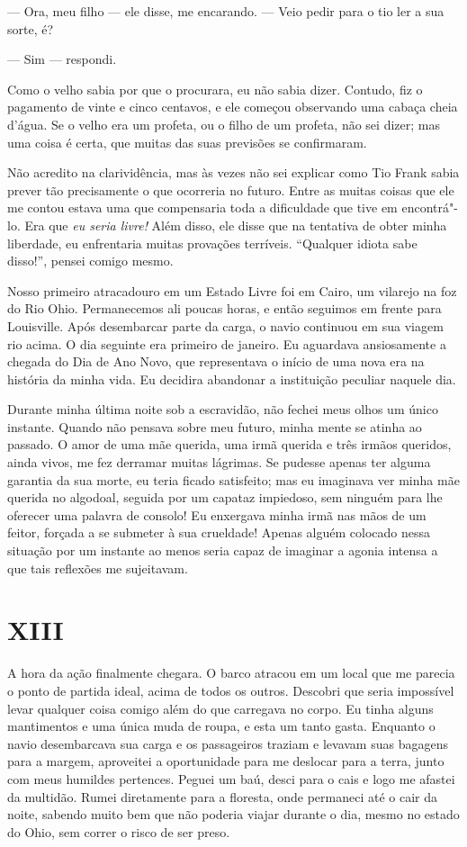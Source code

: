 --- Ora, meu filho --- ele disse, me encarando. --- Veio pedir para o tio
ler a sua sorte, é?

--- Sim --- respondi.

Como o velho sabia por que o procurara, eu não sabia dizer. Contudo, fiz
o pagamento de vinte e cinco centavos, e ele começou observando uma
cabaça cheia d'água. Se o velho era um profeta, ou o filho de um
profeta, não sei dizer; mas uma coisa é certa, que muitas das suas
previsões se confirmaram.

Não acredito na clarividência, mas às vezes não sei explicar como Tio
Frank sabia prever tão precisamente o que ocorreria no futuro. Entre as
muitas coisas que ele me contou estava uma que compensaria toda a
dificuldade que tive em encontrá"-lo. Era que \emph{eu seria livre!} Além
disso, ele disse que na tentativa de obter minha liberdade, eu
enfrentaria muitas provações terríveis. ``Qualquer idiota sabe disso!'',
pensei comigo mesmo.

Nosso primeiro atracadouro em um Estado Livre foi em Cairo, um vilarejo
na foz do Rio Ohio. Permanecemos ali poucas horas, e então seguimos em
frente para Louisville. Após desembarcar parte da carga, o navio
continuou em sua viagem rio acima. O dia seguinte era primeiro de
janeiro. Eu aguardava ansiosamente a chegada do Dia de Ano Novo, que
representava o início de uma nova era na história da minha vida. Eu
decidira abandonar a instituição peculiar naquele dia.

Durante minha última noite sob a escravidão, não fechei meus olhos um
único instante. Quando não pensava sobre meu futuro, minha mente se
atinha ao passado. O amor de uma mãe querida, uma irmã querida e três
irmãos queridos, ainda vivos, me fez derramar muitas lágrimas. Se
pudesse apenas ter alguma garantia da sua morte, eu teria ficado
satisfeito; mas eu imaginava ver minha mãe querida no algodoal, seguida
por um capataz impiedoso, sem ninguém para lhe oferecer uma palavra de
consolo! Eu enxergava minha irmã nas mãos de um feitor, forçada a se
submeter à sua crueldade! Apenas alguém colocado nessa situação por um \label{ref10} 
instante ao menos seria capaz de imaginar a agonia intensa a que tais
reflexões me sujeitavam. 

\chapter{XIII}

A hora da ação finalmente chegara. O barco atracou em um local que me
parecia o ponto de partida ideal, acima de todos os outros. Descobri que
seria impossível levar qualquer coisa comigo além do que carregava no
corpo. Eu tinha alguns mantimentos e uma única muda de roupa, e esta um
tanto gasta. Enquanto o navio desembarcava sua carga e os passageiros
traziam e levavam suas bagagens para a margem, aproveitei a oportunidade
para me deslocar para a terra, junto com meus humildes pertences. Peguei
um baú, desci para o cais e logo me afastei da multidão. Rumei
diretamente para a floresta, onde permaneci até o cair da noite, sabendo
muito bem que não poderia viajar durante o dia, mesmo no estado do Ohio,
sem correr o risco de ser preso.

